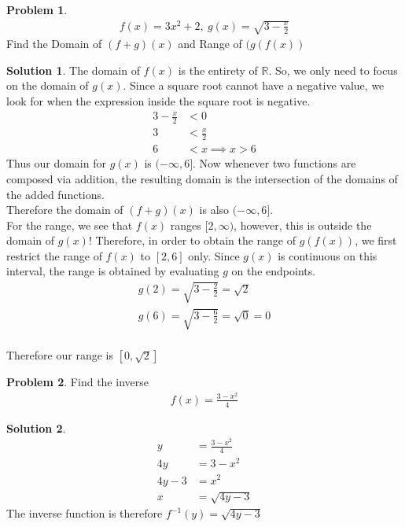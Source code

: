 \documentclass[a4paper]{article}
\theoremstyle{definition}
\newtheorem{problem}{Problem}[section]
\newtheorem*{solution}{Solution}
\begin{document}

\begin{problem}
\begin{align*}
f(x) = 3x^2 + 2, \ g(x) = \sqrt{3 - \frac{x}{2}}
\end{align*}
Find the Domain of \((f+g)(x)\) and Range of \((g(f(x))\)
\end{problem}
\begin{solution}
The domain of \(f(x)\) is the entirety of \(\mathbb{R}\). So, we only need to focus on the domain of \(g(x)\). Since a square root cannot have a negative value, we look for when the expression inside the square root is negative.
\begin{align*}
3 - \frac{x}{2} &< 0 \\
3 &< \frac{x}{2} \\
6 &< x \implies x > 6
\end{align*}
Thus our domain for \(g(x)\) is \((-\infty, 6]\). Now whenever two functions are composed via addition, the resulting domain is the intersection of the domains of the added functions. \\

Therefore the domain of \((f+g)(x)\) is also \((-\infty, 6]\). \\

For the range, we see that \(f(x)\) ranges \([2, \infty)\), however, this is outside the domain of \(g(x)\)! Therefore, in order to obtain the range of \(g(f(x))\), we first restrict the range of \(f(x)\) to \([2, 6]\) only. Since \(g(x)\) is continuous on this interval, the range is obtained by evaluating \(g\) on the endpoints.
\begin{align*}
g(2) = \sqrt{3 - \frac{2}{2}} = \sqrt{2} \\
g(6) = \sqrt{3 - \frac{6}{2}} = \sqrt{0} = 0 \\
\end{align*}

Therefore our range is \([0, \sqrt{2}]\)
\end{solution}

\begin{problem}
Find the inverse
\begin{align*}
f(x) = \frac{3-x^2}{4}
\end{align*}
\end{problem}
\begin{solution}
\begin{align*}
y &= \frac{3-x^2}{4} \\
4y &= 3 -x^2 \\
4y -3 &= x^2 \\
x &= \sqrt{4y-3}
\end{align*}
The inverse function is therefore \(f^{-1}(y) = \sqrt{4y-3}\)
\end{solution}
\end{document}
